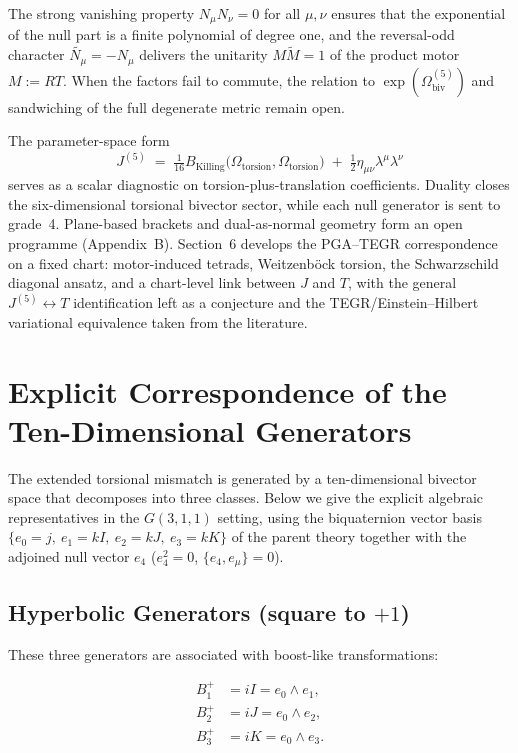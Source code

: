 \documentclass[dvipdfmx,a4paper]{article}
\theoremstyle{definition}
\theoremstyle{plain}
\theoremstyle{remark}
\begin{document}
The strong vanishing property \(N_{\mu}N_{\nu}=0\) for all \(\mu,\nu\) ensures that the exponential of the null part is a finite polynomial of degree one, and the reversal-odd character \(\widetilde{N_{\mu}}=-N_{\mu}\) delivers the unitarity \(M\widetilde{M}=1\) of the product motor \(M:=RT\). When the factors fail to commute, the relation to \(\exp(\Omega_{\mathrm{biv}}^{(5)})\) and sandwiching of the full degenerate metric remain open.

The parameter-space form
\[
J^{(5)} \;=\; \tfrac{1}{16}B_{\text{Killing}}\!\bigl(\Omega_{\text{torsion}},\Omega_{\text{torsion}}\bigr) \;+\; \tfrac{1}{2}\eta_{\mu\nu}\lambda^{\mu}\lambda^{\nu}
\]
serves as a scalar diagnostic on torsion-plus-translation coefficients. Duality closes the six-dimensional torsional bivector sector, while each null generator is sent to grade~4. Plane-based brackets and dual-as-normal geometry form an open programme (Appendix~B). Section~6 develops the PGA--TEGR correspondence on a fixed chart: motor-induced tetrads, Weitzenb\"{o}ck torsion, the Schwarzschild diagonal ansatz, and a chart-level link between \(J\) and \(T\), with the general \(J^{(5)}\leftrightarrow T\) identification left as a conjecture and the TEGR/Einstein--Hilbert variational equivalence taken from the literature.

\appendix

\section{Explicit Correspondence of the Ten-Dimensional Generators}

The extended torsional mismatch is generated by a ten-dimensional bivector space that decomposes into three classes. Below we give the explicit algebraic representatives in the \(G(3,1,1)\) setting, using the biquaternion vector basis \(\{e_{0}=j,\ e_{1}=kI,\ e_{2}=kJ,\ e_{3}=kK\}\) of the parent theory together with the adjoined null vector \(e_{4}\) (\(e_{4}^{2}=0\), \(\{e_{4},e_{\mu}\}=0\)).

\subsection{Hyperbolic Generators (square to \(+1\))}

These three generators are associated with boost-like transformations:

\begin{align*}
B_{1}^{+} &= iI = e_{0}\wedge e_{1}, \\
B_{2}^{+} &= iJ = e_{0}\wedge e_{2}, \\
B_{3}^{+} &= iK = e_{0}\wedge e_{3}.
\end{align*}
\end{document}
